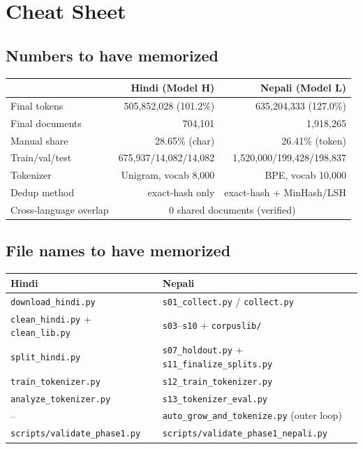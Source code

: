 \documentclass[11pt]{report}
\begin{document}
\chapter{Cheat Sheet}
\label{chap:limitations}

\section{Numbers to have memorized}

\begin{center}
\begin{tabular}{lrr}
\toprule
& \textbf{Hindi (Model H)} & \textbf{Nepali (Model L)} \\
\midrule
Final tokens & 505,852,028 (101.2\%) & 635,204,333 (127.0\%) \\
Final documents & 704,101 & 1,918,265 \\
Manual share & 28.65\% (char) & 26.41\% (token) \\
Train/val/test & 675,937/14,082/14,082 & 1,520,000/199,428/198,837 \\
Tokenizer & Unigram, vocab 8,000 & BPE, vocab 10,000 \\
Dedup method & exact-hash only & exact-hash + MinHash/LSH \\
Cross-language overlap & \multicolumn{2}{c}{0 shared documents (verified)} \\
\bottomrule
\end{tabular}
\end{center}

\section{File names to have memorized}

\begin{center}
\begin{tabular}{ll}
\toprule
Hindi & Nepali \\
\midrule
\texttt{download\_hindi.py} & \texttt{s01\_collect.py} / \texttt{collect.py} \\
\texttt{clean\_hindi.py} + \texttt{clean\_lib.py} & \texttt{s03}--\texttt{s10} + \texttt{corpuslib/} \\
\texttt{split\_hindi.py} & \texttt{s07\_holdout.py} + \texttt{s11\_finalize\_splits.py} \\
\texttt{train\_tokenizer.py} & \texttt{s12\_train\_tokenizer.py} \\
\texttt{analyze\_tokenizer.py} & \texttt{s13\_tokenizer\_eval.py} \\
-- & \texttt{auto\_grow\_and\_tokenize.py} (outer loop) \\
\texttt{scripts/validate\_phase1.py} & \texttt{scripts/validate\_phase1\_nepali.py} \\
\bottomrule
\end{tabular}
\end{center}
\end{document}
